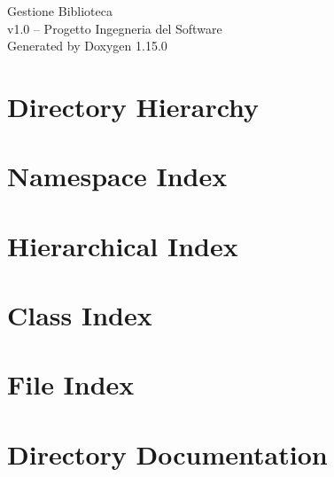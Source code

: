 \documentclass[twoside]{book}
\newcommand{\+}{\discretionary{\mbox{\scriptsize$\hookleftarrow$}}{}{}}
\newcommand{\clearemptydoublepage}{%
    \newpage{\pagestyle{empty}\cleardoublepage}%
  }
\begin{document}
  \raggedbottom
    \hypersetup{pageanchor=false,
                bookmarksnumbered=true,
                pdfencoding=unicode
               }
  \begin{titlepage}
  \vspace*{7cm}
  \begin{center}%
  {\Large Gestione Biblioteca}\\
  [1ex]\large v1.\+0 – Progetto Ingegneria del Software \\
  \vspace*{1cm}
  {\large Generated by Doxygen 1.15.0}\\
  \end{center}
  \end{titlepage}
  \clearemptydoublepage
  \tableofcontents
  \clearemptydoublepage
  \hypersetup{pageanchor=true}
\chapter{Directory Hierarchy}

\chapter{Namespace Index}

\chapter{Hierarchical Index}

\chapter{Class Index}

\chapter{File Index}

\chapter{Directory Documentation}










\end{document}
